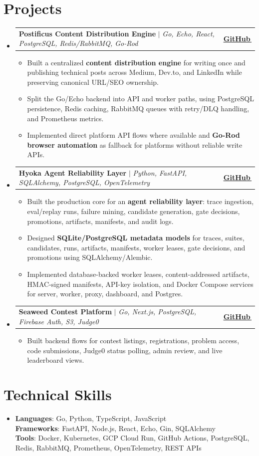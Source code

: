 \documentclass[letterpaper,11pt]{article}
\makeatletter
\newcommand{\bodyhref}[2]{\href{#1}{\underline{#2}\,\faExternalLink*}}
\newcommand{\resumeItem}[1]{\item{\fontsize{8.82pt}{9.28pt}\selectfont #1\vspace{-0.7pt}}}
\newcommand{\resumeProjectHeading}[2]{
    \item
    \begin{tabular*}{1.0\textwidth}{l@{\extracolsep{\fill}}r}
      \small#1 & \textbf{\small #2}\\
    \end{tabular*}\vspace{-4pt}
}
\newcommand{\resumeSubHeadingListStart}{\begin{itemize}[leftmargin=0.0in, label={}, itemsep=0.6pt, topsep=0pt, parsep=0pt, partopsep=0pt]}
\newcommand{\resumeSubHeadingListEnd}{\end{itemize}}
\newcommand{\resumeItemListStart}{\begin{itemize}[leftmargin=0.16in,itemsep=0.3pt,topsep=0.9pt,parsep=0pt,partopsep=0pt]}
\newcommand{\resumeItemListEnd}{\end{itemize}\vspace{-3pt}}
\makeatother
\begin{document}
\section{Projects}
\resumeSubHeadingListStart
\resumeProjectHeading
{\textbf{Postificus Content Distribution Engine} $|$ \emph{Go, Echo, React, PostgreSQL, Redis/RabbitMQ, Go-Rod}}{\bodyhref{https://github.com/unichronic/postificus}{GitHub}}
\resumeItemListStart
\resumeItem{Built a centralized \textbf{content distribution engine} for writing once and publishing technical posts across Medium, Dev.to, and LinkedIn while preserving canonical URL/SEO ownership.}
\resumeItem{Split the Go/Echo backend into API and worker paths, using PostgreSQL persistence, Redis caching, RabbitMQ queues with retry/DLQ handling, and Prometheus metrics.}
\resumeItem{Implemented direct platform API flows where available and \textbf{Go-Rod browser automation} as fallback for platforms without reliable write APIs.}
\resumeItemListEnd
\resumeProjectHeading
{\textbf{Hyoka Agent Reliability Layer} $|$ \emph{Python, FastAPI, SQLAlchemy, PostgreSQL, OpenTelemetry}}{\bodyhref{https://github.com/unichronic/hyoka}{GitHub}}
\resumeItemListStart
\resumeItem{Built the production core for an \textbf{agent reliability layer}: trace ingestion, eval/replay runs, failure mining, candidate generation, gate decisions, promotions, artifacts, manifests, and audit logs.}
\resumeItem{Designed \textbf{SQLite/PostgreSQL metadata models} for traces, suites, candidates, runs, artifacts, manifests, worker leases, gate decisions, and promotions using SQLAlchemy/Alembic.}
\resumeItem{Implemented database-backed worker leases, content-addressed artifacts, HMAC-signed manifests, API-key isolation, and Docker Compose services for server, worker, proxy, dashboard, and Postgres.}
\resumeItemListEnd
\resumeProjectHeading
{\textbf{Seaweed Contest Platform} $|$ \emph{Go, Next.js, PostgreSQL, Firebase Auth, S3, Judge0}}{\bodyhref{https://github.com/unichronic/seaweed-fe}{GitHub}}
\resumeItemListStart
\resumeItem{Built backend flows for contest listings, registrations, problem access, code submissions, Judge0 status polling, admin review, and live leaderboard views.}
\resumeItemListEnd
\resumeSubHeadingListEnd

\section{Technical Skills}
\begin{itemize}[leftmargin=0.15in, label={}, topsep=0pt, itemsep=0pt, parsep=0pt, partopsep=0pt]
  \item{\fontsize{9.0pt}{9.25pt}\selectfont
   \textbf{Languages}{: Go, Python, TypeScript, JavaScript} \\
   \textbf{Frameworks}{: FastAPI, Node.js, React, Echo, Gin, SQLAlchemy} \\
   \textbf{Tools}{: Docker, Kubernetes, GCP Cloud Run, GitHub Actions, PostgreSQL, Redis, RabbitMQ, Prometheus, OpenTelemetry, REST APIs} \\
  }
\end{itemize}
\end{document}
